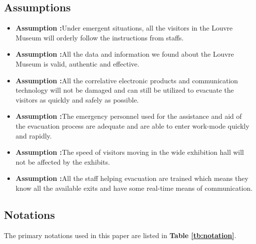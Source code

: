 \documentclass[12pt]{article}
\begin{document}
\subsection{Assumptions}
\begin{itemize}
	\item \textbf{Assumption \uppercase\expandafter{}:}Under emergent situations, all the visitors in the Louvre Museum will orderly follow the instructions from staffs.\\
 
	\item \textbf{Assumption \uppercase\expandafter{}:}All the data and information we found about the Louvre Museum is valid, authentic and effective.
	
	\item \textbf{Assumption \uppercase\expandafter{}:}All the correlative electronic products and communication technology will not be damaged and can still be utilized to evacuate the visitors as quickly and safely as possible.
	\item \textbf{Assumption \uppercase\expandafter{}:}The emergency personnel used for the assistance and aid of the evacuation process are adequate and are able to enter work-mode quickly and rapidly.  
	\item \textbf{Assumption \uppercase\expandafter{}:}The speed of visitors moving in the wide exhibition hall will not be affected by the exhibits.
	\item \textbf{Assumption \uppercase\expandafter{}:}All the staff helping evacuation are trained which means they know all the available exits and have some real-time means of communication.
\end{itemize}






\subsection{Notations}
The primary notations used in this paper are listed in \textbf{Table \ref{tb:notation}}.
\end{document}
